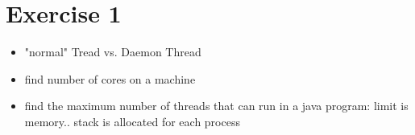 \section{Exercise 1}

\begin{itemize}
  \item "normal" Tread vs. Daemon Thread
  \item find number of cores on a machine
  \item find the maximum number of threads that can run in a java program: limit is memory.. stack is allocated for each process
\end{itemize}

